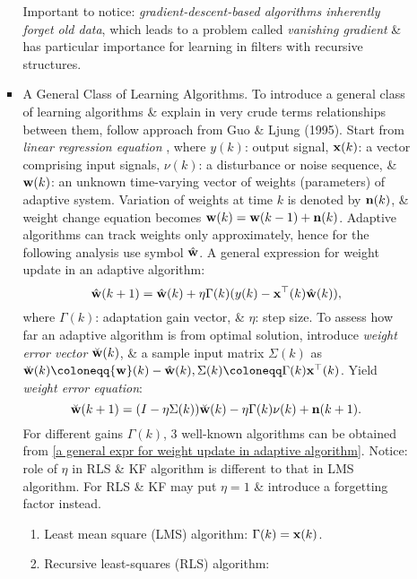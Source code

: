 \documentclass{article}
\begin{document}
\begin{enumerate}
\begin{itemize}
\begin{itemize}
			Important to notice: {\it gradient-descent-based algorithms inherently forget old data}, which leads to a problem called {\it vanishing gradient} \& has particular importance for learning in filters with recursive structures.
			\item {\sf A General Class of Learning Algorithms.} To introduce a general class of learning algorithms \& explain in very crude terms relationships between them, follow approach from Guo \& Ljung (1995). Start from {\it linear regression equation} , where $y(k)$: output signal, ${\bf x}(k)$: a vector comprising input signals, $\nu(k)$: a disturbance or noise sequence, \& ${\bf w}(k)$: an unknown time-varying vector of weights (parameters) of adaptive system. Variation of weights at time $k$ is denoted by ${\bf n}(k)$, \& weight change equation becomes ${\bf w}(k) = {\bf w}(k - 1) + {\bf n}(k)$. Adaptive algorithms can track weights only approximately, hence for the following analysis use symbol $\hat{\bf w}$. A general expression for weight update in an adaptive algorithm:
			\begin{equation}
				\label{a general expr for weight update in adaptive algorithm}
				\hat{\bf w}(k + 1) = \hat{\bf w}(k) + \eta\Gamma(k)(y(k) - {\bf x}^\top(k)\hat{\bf w}(k)),
			\end{equation}
			where $\Gamma(k)$: adaptation gain vector, \& $\eta$: step size. To assess how far an adaptive algorithm is from optimal solution, introduce {\it weight error vector} $\breve{\bf w}(k)$, \& a sample input matrix $\Sigma(k)$ as $\breve{\bf w}(k)\coloneqq{\bf w}(k) - \hat{\bf w}(k),\Sigma(k)\coloneqq\Gamma(k){\bf x}^\top(k)$. Yield {\it weight error equation}:
			\begin{equation}
				\label{weight error}
				\breve{\bf w}(k + 1) = (I - \eta\Sigma(k))\breve{\bf w}(k) - \eta\Gamma(k)\nu(k) + {\bf n}(k + 1).
			\end{equation}
			For different gains $\Gamma(k)$, 3 well-known algorithms can be obtained from \eqref{a general expr for weight update in adaptive algorithm}. Notice: role of $\eta$ in RLS \& KF algorithm is different to that in LMS algorithm. For RLS \& KF may put $\eta = 1$ \& introduce a forgetting factor instead.
			\begin{enumerate}
				\item Least mean square (LMS) algorithm: $\Gamma(k) = {\bf x}(k)$.
				\item Recursive least-squares (RLS) algorithm:
				\begin{align}

\end{align}
\end{enumerate}
\end{itemize}
\end{itemize}
\end{enumerate}
\end{document}

